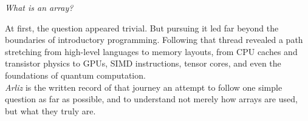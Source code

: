 {\begin{center}
    \emph{What is an array?}
\end{center}
At first, the question appeared trivial. But pursuing it led far beyond the boundaries
of introductory programming. Following that thread revealed a path stretching from
high-level languages to memory layouts, from CPU caches and transistor physics to GPUs,
SIMD instructions, tensor cores, and even the foundations of quantum computation.\\
\textit{Arliz} is the written record of that journey an attempt to follow one simple
question as far as possible, and to understand not merely how arrays are used, but what
they truly are.
}

\clearpage